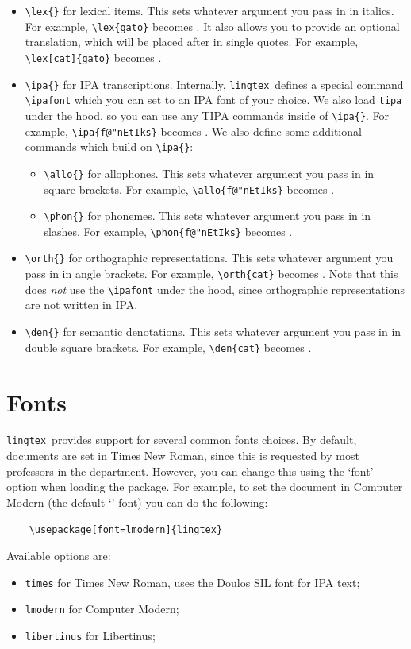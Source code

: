 \documentclass{article}
\def\lingtex{\texttt{lingtex}}
\begin{document}
\begin{itemize}
    \item \verb|\lex{}| for lexical items. This sets whatever argument you pass in in italics. For example, \verb|\lex{gato}| becomes . It also allows you to provide an optional translation, which will be placed after in single quotes. For example, \verb|\lex[cat]{gato}| becomes .
    \item \verb|\ipa{}| for IPA transcriptions. Internally, \lingtex\ defines a special command \verb|\ipafont| which you can set to an IPA font of your choice. We also load \verb|tipa| under the hood, so you can use any TIPA commands inside of \verb|\ipa{}|. For example, \verb|\ipa{f@"nEtIks}| becomes . We also define some additional commands which build on \verb|\ipa{}|:
    \begin{itemize}
        \item \verb|\allo{}| for allophones. This sets whatever argument you pass in in square brackets. For example, \verb|\allo{f@"nEtIks}| becomes .
        \item \verb|\phon{}| for phonemes. This sets whatever argument you pass in in slashes. For example, \verb|\phon{f@"nEtIks}| becomes .
    \end{itemize}
    \item \verb|\orth{}| for orthographic representations. This sets whatever argument you pass in in angle brackets. For example, \verb|\orth{cat}| becomes . Note that this does \emph{not} use the \verb|\ipafont| under the hood, since orthographic representations are not written in IPA.
    \item \verb|\den{}| for semantic denotations. This sets whatever argument you pass in in double square brackets. For example, \verb|\den{cat}| becomes .
\end{itemize}

\section{Fonts} \label{sec:fonts}

\lingtex\ provides support for several common fonts choices. By default, documents are set in Times New Roman, since this is requested by most professors in the department. However, you can change this using the `font' option when loading the package. For example, to set the document in Computer Modern (the default `' font) you can do the following:
\begin{verbatim}
    \usepackage[font=lmodern]{lingtex}
\end{verbatim}
Available options are:
\begin{itemize}
    \item \verb|times| for Times New Roman, uses the Doulos SIL font for IPA text;
    \item \verb|lmodern| for Computer Modern;
    \item \verb|libertinus| for Libertinus;
\end{itemize}
\end{document}
